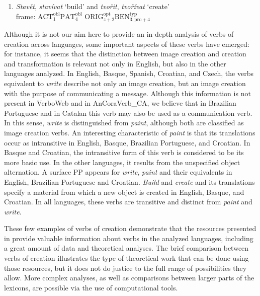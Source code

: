 \documentclass[english]{textolivre}
\begin{document}
\begin{enumerate}[label=(\arabic*),resume]
\item \label{itm41} \textit{Stavět}, \textit{stavívat} ‘build’ and \textit{tvořit}, \textit{tvořívat} ‘create’ \\
frame: $\text{ACT}^{\text{obl}}_{1} \text{PAT}^{\text{obl}}_{4}$ 
$\text{ORIG}^{\text{opt}}_{z+2} \text{BEN}^{\text{typ}}_{3,\text{pro}+4}$
\end{enumerate}

Although it is not our aim here to provide an in-depth analysis of verbs of creation across languages, some important aspects of these verbs have emerged: for instance, it seems that the distinction between image creation and creation and transformation is relevant not only in English, but also in the other languages analyzed. In English, Basque, Spanish, Croatian, and Czech, the verbs equivalent to \textit{write} describe not only an image creation, but an image creation with the purpose of communicating a message. Although this information is not present in VerboWeb and in AnCoraVerb\_CA, we believe that in Brazilian Portuguese and in Catalan this verb may also be used as a communication verb. In this sense, \textit{write} is distinguished from \textit{paint}, although both are classified as image creation verbs. An interesting characteristic of \textit{paint} is that its translations occur as intransitive in English, Basque, Brazilian Portuguese, and Croatian. In Basque and Croatian, the intransitive form of this verb is considered to be its more basic use. In the other languages, it results from the unspecified object alternation. A surface PP appears for \textit{write}, \textit{paint} and their equivalents in English, Brazilian Portuguese and Croatian. \textit{Build} and \textit{create} and its translations specify a material from which a new object is created in English, Basque, and Croatian. In all languages, these verbs are transitive and distinct from \textit{paint} and \textit{write}.

These few examples of verbs of creation demonstrate that the resources presented in  provide valuable information about verbs in the analyzed languages, including a great amount of data and theoretical analyses. The brief comparison between verbs of creation illustrates the type of theoretical work that can be done using those resources, but it does not do justice to the full range of possibilities they allow. More complex analyses, as well as comparisons between larger parts of the lexicons, are possible via the use of computational tools.
\end{document}
